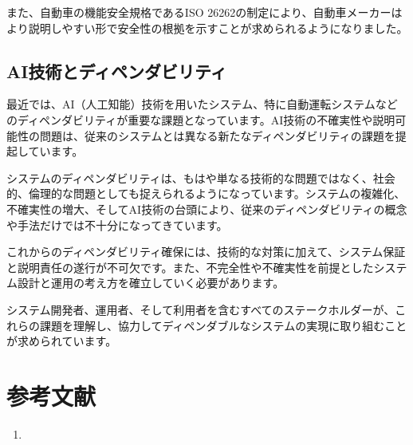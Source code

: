 また、自動車の機能安全規格であるISO 26262の制定により、自動車メーカーはより説明しやすい形で安全性の根拠を示すことが求められるようになりました。

\subsection{AI技術とディペンダビリティ}

最近では、AI（人工知能）技術を用いたシステム、特に自動運転システムなどのディペンダビリティが重要な課題となっています。AI技術の不確実性や説明可能性の問題は、従来のシステムとは異なる新たなディペンダビリティの課題を提起しています。


システムのディペンダビリティは、もはや単なる技術的な問題ではなく、社会的、倫理的な問題としても捉えられるようになっています。システムの複雑化、不確実性の増大、そしてAI技術の台頭により、従来のディペンダビリティの概念や手法だけでは不十分になってきています。

これからのディペンダビリティ確保には、技術的な対策に加えて、システム保証と説明責任の遂行が不可欠です。また、不完全性や不確実性を前提としたシステム設計と運用の考え方を確立していく必要があります。

システム開発者、運用者、そして利用者を含むすべてのステークホルダーが、これらの課題を理解し、協力してディペンダブルなシステムの実現に取り組むことが求められています。

\section*{参考文献}
\begin{enumerate}
\item 
\end{enumerate}

